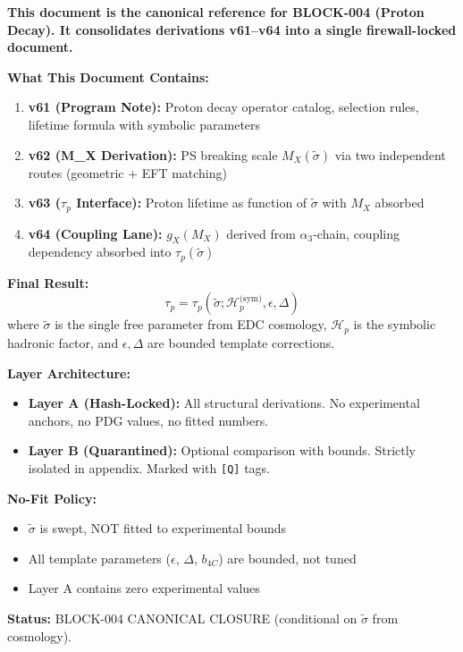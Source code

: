 \documentclass[11pt,a4paper]{article}
\newcommand{\tagQ}{\textcolor{red!70!black}{\texttt{[Q]}}}
\theoremstyle{definition}
\begin{document}
\begin{readercontract}
\textbf{This document is the canonical reference for BLOCK-004 (Proton Decay).
It consolidates derivations v61--v64 into a single firewall-locked document.}

\textbf{What This Document Contains:}
\begin{enumerate}
  \item \textbf{v61 (Program Note):} Proton decay operator catalog, selection rules,
        lifetime formula with symbolic parameters
  \item \textbf{v62 (M\_X Derivation):} PS breaking scale $M_X(\tilde{\sigma})$ via
        two independent routes (geometric + EFT matching)
  \item \textbf{v63 ($\tau_p$ Interface):} Proton lifetime as function of $\tilde{\sigma}$
        with $M_X$ absorbed
  \item \textbf{v64 (Coupling Lane):} $g_X(M_X)$ derived from $\alpha_3$-chain,
        coupling dependency absorbed into $\tau_p(\tilde{\sigma})$
\end{enumerate}

\textbf{Final Result:}
\begin{equation}
\label{eq:contract-final}
\boxed{\tau_p = \tau_p(\tilde{\sigma}; \mathcal{H}_p^{\text{(sym)}}, \epsilon, \Delta)}
\end{equation}
where $\tilde{\sigma}$ is the single free parameter from EDC cosmology,
$\mathcal{H}_p$ is the symbolic hadronic factor, and $\epsilon, \Delta$ are
bounded template corrections.

\textbf{Layer Architecture:}
\begin{itemize}
  \item \textbf{Layer A (Hash-Locked):} All structural derivations. No experimental
        anchors, no PDG values, no fitted numbers.
  \item \textbf{Layer B (Quarantined):} Optional comparison with bounds.
        Strictly isolated in appendix. Marked with \tagQ{} tags.
\end{itemize}

\textbf{No-Fit Policy:}
\begin{itemize}
  \item $\tilde{\sigma}$ is swept, NOT fitted to experimental bounds
  \item All template parameters ($\epsilon$, $\Delta$, $b_{4C}$) are bounded, not tuned
  \item Layer A contains zero experimental values
\end{itemize}

\textbf{Status:} BLOCK-004 CANONICAL CLOSURE (conditional on $\tilde{\sigma}$ from cosmology).
\end{readercontract}
\end{document}
